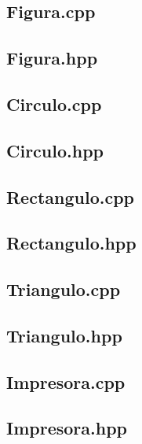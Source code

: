 \documentclass[11pt]{article}
\begin{document}
\begin{itemize}
\subsection{Figura.cpp}

\newpage

\subsection{Figura.hpp}

\newpage


\subsection{Circulo.cpp}

\newpage

\subsection{Circulo.hpp}

\newpage


\subsection{Rectangulo.cpp}

\newpage

\subsection{Rectangulo.hpp}

\newpage


\subsection{Triangulo.cpp}

\newpage

\subsection{Triangulo.hpp}

\newpage

\subsection{Impresora.cpp}

\newpage

\subsection{Impresora.hpp}

\newpage



\end{itemize}
\end{document}
